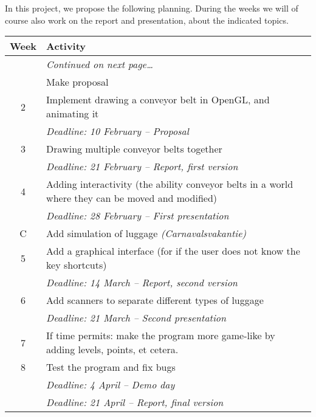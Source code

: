 In this project, we propose the following planning. During the weeks we will of course also work on the report and presentation, about the indicated topics.

\begin{longtabu} to 0.99
 \toprule
 \textbf{Week} & \textbf{Activity} \\
 \midrule
 \endhead
 \bottomrule
 & \vspace*{-5pt}\hfill\textit{Continued on next page\ldots} \\
 \endfoot
 \bottomrule
  & Make proposal \\
 2 & Implement drawing a conveyor belt in OpenGL, and animating it \\
   & \textit{Deadline: 10 February -- Proposal} \\
 3 & Drawing multiple conveyor belts together \\
   & \textit{Deadline: 21 February -- Report, first version} \\
 4 & Adding interactivity (the ability conveyor belts in a world where they can be moved and modified) \\
   & \textit{Deadline: 28 February -- First presentation} \\
 C & Add simulation of luggage \textit{(Carnavalsvakantie)} \\
 5 & Add a graphical interface (for if the user does not know the key shortcuts) \\
   & \textit{Deadline: 14 March -- Report, second version} \\
 6 & Add scanners to separate different types of luggage \\
   & \textit{Deadline: 21 March -- Second presentation} \\
 7 & If time permits: make the program more game-like by adding levels, points, et cetera. \\
 8 & Test the program and fix bugs \\
   & \textit{Deadline: 4 April -- Demo day} \\
   & \textit{Deadline: 21 April -- Report, final version} \\
\end{longtabu}

